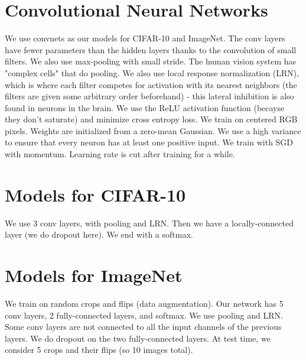 \documentclass[a4paper]{article}
\begin{document}
\section{Convolutional Neural Networks}
We use convnets as our models for CIFAR-10 and ImageNet. The conv layers have
fewer parameters than the hidden layers thanks to the convolution of small
filters. We also use max-pooling with small stride. The human vision system
has "complex cells" that do pooling. We also use local response normalization
(LRN), which is where each filter competes for activation with its nearest
neighbors (the filters are given some arbitrary order beforehand) - this
lateral inhibition is also found in neurons in the brain. We use the ReLU
activation function (becayse they don't saturate) and minimize cross entropy
loss. We train on centered RGB pixels. Weights are initialized from a
zero-mean Gaussian. We use a high variance to ensure that every neuron has at
least one positive input. We train with SGD with momentum. Learning rate is
cut after training for a while.

\section{Models for CIFAR-10}
We use 3 conv layers, with pooling and LRN. Then we have a locally-connected
layer (we do dropout here). We end with a softmax.

\section{Models for ImageNet}
We train on random crops and flips (data augmentation). Our network has
5 conv layers, 2 fully-connected layers, and softmax. We use pooling and LRN.
Some conv layers are not connected to all the input channels of the previous
layers. We do dropout on the two fully-connected layers. At test time, we
consider 5 crops and their flips (so 10 images total).
\end{document}
